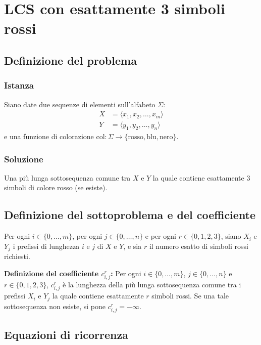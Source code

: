 \chapter{LCS con esattamente 3 simboli rossi}

\section{Definizione del problema}

\subsection{Istanza}
Siano date due sequenze di elementi sull'alfabeto $\Sigma$:
\begin{align*}
    X &= \langle x_1, x_2, \dots, x_m \rangle \\
    Y &= \langle y_1, y_2, \dots, y_n \rangle
\end{align*}
e una funzione di colorazione $\text{col} : \Sigma \to \{\text{rosso}, \text{blu}, \text{nero}\}$.

\subsection{Soluzione}
Una più lunga sottosequenza comune tra $X$ e $Y$ la quale contiene esattamente $3$ simboli di colore rosso (se esiste).

\section{Definizione del sottoproblema e del coefficiente}
Per ogni $i \in \{0, \dots, m\}$, per ogni $j \in \{0, \dots, n\}$ e per ogni $r \in \{0, 1, 2, 3\}$, siano $X_i$ e $Y_j$ i prefissi di lunghezza $i$ e $j$ di $X$ e $Y$, e sia $r$ il numero esatto di simboli rossi richiesti.

\medskip
\noindent
\textbf{Definizione del coefficiente $c_{i,j}^r$:} Per ogni $i \in \{0, \dots, m\}$, $j \in \{0, \dots, n\}$ e $r \in \{0, 1, 2, 3\}$, $c_{i,j}^r$ è la lunghezza della più lunga sottosequenza comune tra i prefissi $X_i$ e $Y_j$ la quale contiene esattamente $r$ simboli rossi. Se una tale sottosequenza non esiste, si pone $c_{i,j}^r = -\infty$.

\section{Equazioni di ricorrenza}

